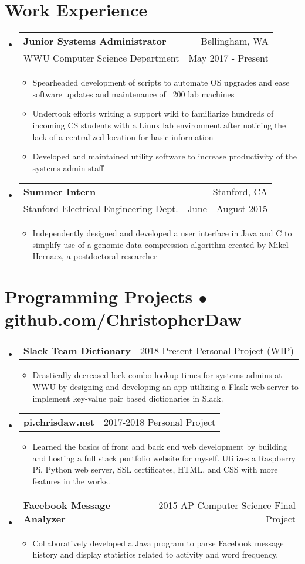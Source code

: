 \documentclass[12pt, letterpaper]{article}
\makeatletter
\newcommand{\resumeItem}[1]{
  \item[$\bullet$]{
    \small{#1} \vspace{-2pt}
  }
}
\newcommand{\resumeSubsection}[4]{
  \vspace{-4pt}\item[]
    \begin{tabular*}{0.97\textwidth}{@{\extracolsep{\fill}} l r}
      \textbf{#1} & #2 \\
      \small{#3} & \small{#4} \\
    \end{tabular*}\vspace{-5pt}
}
\newcommand{\resumeProject}[3]{
  \vspace{-4pt}\item[]
    \begin{tabular*}{0.97\textwidth}{@{\extracolsep{\fill}} l r}
      \textbf{#1} & #2 \\
    \end{tabular*}\vspace{-5pt}
    \begin{itemize}
        \item[] \small {#3}
    \end{itemize}\vspace{-3pt}
}
\makeatother
\begin{document}
\section{Work Experience}
  \begin{itemize}[leftmargin=*]
    \resumeSubsection
      {Junior Systems Administrator}{Bellingham, WA}
      {WWU Computer Science Department}{May 2017 - Present}
      \begin{itemize}
        \resumeItem{
          Spearheaded development of scripts to automate OS upgrades and ease software updates and maintenance of ~200 lab machines}
        \resumeItem{
            Undertook efforts writing a support wiki to familiarize hundreds of incoming CS students with a Linux lab environment after noticing the lack of a centralized location for basic information}
        \resumeItem{
            Developed and maintained utility software to increase productivity of the systems admin staff}
      \end{itemize}

    \resumeSubsection
      {Summer Intern}{Stanford, CA}
      {Stanford Electrical Engineering Dept.}{June - August 2015}
      \begin{itemize}
        \resumeItem{
            Independently designed and developed a user interface in Java and C to simplify use of a genomic data compression algorithm created by Mikel Hernaez, a postdoctoral researcher}
      \end{itemize}
    \end{itemize}

\section{Programming Projects $\bullet$ github.com/ChristopherDaw}
  \begin{itemize}[leftmargin=*]
    \resumeProject
      {Slack Team Dictionary}{2018-Present Personal Project (WIP)}
      {Drastically decreased lock combo lookup times for systems admins at WWU by designing and developing an app utilizing a Flask web server to implement key-value pair based dictionaries in Slack.}
  \resumeProject
      {pi.chrisdaw.net}{2017-2018 Personal Project}
      {Learned the basics of front and back end web development by building and hosting a full stack portfolio website for myself. Utilizes a Raspberry Pi, Python web server, SSL certificates, HTML, and CSS with more features in the works.}
  \resumeProject
      {Facebook Message Analyzer}{2015 AP Computer Science Final Project}
      {Collaboratively developed a Java program to parse Facebook message history and display statistics related to activity and word frequency.}
  \end{itemize}
\end{document}
